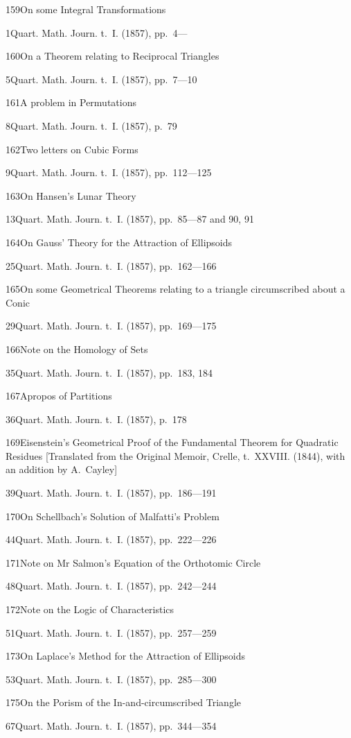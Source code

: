 \documentclass[11pt,a4paper]{book}
\providecommand{\tocentry}[2]{#1\dotfill #2\par}
\begin{document}
\tocentry{159}{On some Integral Transformations}{1}{Quart. Math. Journ. t.~I. (1857), pp.~4---}

\tocentry{160}{On a Theorem relating to Reciprocal Triangles}{5}{Quart. Math. Journ. t.~I. (1857), pp.~7---10}

\tocentry{161}{A problem in Permutations}{8}{Quart. Math. Journ. t.~I. (1857), p.~79}

\tocentry{162}{Two letters on Cubic Forms}{9}{Quart. Math. Journ. t.~I. (1857), pp.~112---125}

\tocentry{163}{On Hansen's Lunar Theory}{13}{Quart. Math. Journ. t.~I. (1857), pp.~85---87 and 90, 91}

\tocentry{164}{On Gauss' Theory for the Attraction of Ellipsoids}{25}{Quart. Math. Journ. t.~I. (1857), pp.~162---166}

\tocentry{165}{On some Geometrical Theorems relating to a triangle circumscribed about a Conic}{29}{Quart. Math. Journ. t.~I. (1857), pp.~169---175}

\tocentry{166}{Note on the Homology of Sets}{35}{Quart. Math. Journ. t.~I. (1857), pp.~183, 184}

\tocentry{167}{Apropos of Partitions}{36}{Quart. Math. Journ. t.~I. (1857), p.~178}


\tocentry{169}{Eisenstein's Geometrical Proof of the Fundamental Theorem for Quadratic Residues [Translated from the Original Memoir, Crelle, t.~XXVIII. (1844), with an addition by A.~Cayley]}{39}{Quart. Math. Journ. t.~I. (1857), pp.~186---191}

\tocentry{170}{On Schellbach's Solution of Malfatti's Problem}{44}{Quart. Math. Journ. t.~I. (1857), pp.~222---226}

\newpage

\tocentry{171}{Note on Mr Salmon's Equation of the Orthotomic Circle}{48}{Quart. Math. Journ. t.~I. (1857), pp.~242---244}

\tocentry{172}{Note on the Logic of Characteristics}{51}{Quart. Math. Journ. t.~I. (1857), pp.~257---259}

\tocentry{173}{On Laplace's Method for the Attraction of Ellipsoids}{53}{Quart. Math. Journ. t.~I. (1857), pp.~285---300}


\tocentry{175}{On the Porism of the In-and-circumscribed Triangle}{67}{Quart. Math. Journ. t.~I. (1857), pp.~344---354}
\end{document}
